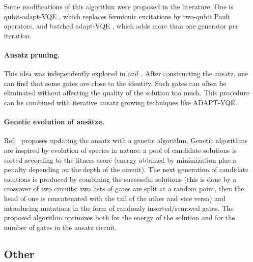 Some modifications of this algorithm were proposed in the literature. One is qubit-adapt-VQE \cite{tang_qubit-adapt-vqe_2021}, which replaces fermionic excitations by two-qubit Pauli operators, and batched adapt-VQE \cite{sapova_variational_2021}, which adds more than one generator per iteration.

\paragraph{Ansatz pruning.} This idea was independently explored in \cite{bilkis_semi-agnostic_2021} and \cite{sim_adaptive_2021}. After constructing the ansatz, one can find that some gates are close to the identity. Such gates can often be eliminated without affecting the quality of the solution too much. This procedure can be combined with iterative ansatz growing techniques like ADAPT-VQE.

\paragraph{Genetic evolution of ans\"atze.} Ref.~\cite{chivilikhin_mog-vqe_2020} proposes updating the ansatz with a genetic algorithm. Genetic algorithms are inspired by evolution of species in nature: a pool of candidate solutions is sorted according to the fitness score (energy obtained by minimization plus a penalty depending on the depth of the circuit). The next generation of candidate solutions is produced by combining the successful solutions (this is done by a crossover of two circuits: two lists of gates are split at a random point, then the head of one is concatenated with the tail of the other and vice versa) and introducing mutations in the form of randomly inserted/removed gates. The proposed algorithm optimizes both for the energy of the solution and for the number of gates in the ansatz circuit.

\subsection{Other}

